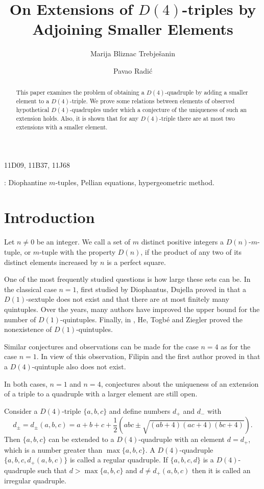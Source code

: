 \documentclass[12pt]{amsart}%
\title{On Extensions of $D(4)$-triples by Adjoining Smaller Elements}
\author{Marija {Bliznac Trebje\v{s}anin}}
\author{Pavao Radi\'{c}}
\theoremstyle{definition}
\theoremstyle{remark}
\theoremstyle{plain}
\begin{document}
\begin{abstract} 
This paper examines the problem of obtaining a $D(4)$-quadruple by adding a smaller element to a $D(4)$-triple. We prove some relations between elements of observed hypothetical $D(4)$-quadruples under which a conjecture of the uniqueness of such an extension holds. Also, it is shown that for any $D(4)$-triple there are at most two extensions with a smaller element.
\end{abstract}

\maketitle

 11D09, 11B37, 11J68

: Diophantine $m$-tuples, Pellian equations, hypergeometric method.


\section{Introduction}


Let $n\neq0$ be an integer. We call a set of $m$ distinct positive integers a $D(n)$-$m$-tuple, or $m$-tuple with the property $D(n)$, if the product of any two of its distinct elements increased by $n$ is a perfect square.

One of the most frequently studied questions is how large these sets can be. In the classical case $n=1$, first studied by Diophantus, Dujella proved in \cite{duje_kon} that a $D(1)$-sextuple does not exist and that there are at most finitely many quintuples. Over the years, many authors have improved the upper bound for the number of $D(1)$-quintuples. Finally, in \cite{petorke}, He, Togb\'{e} and Ziegler proved the nonexistence of $D(1)$-quintuples. 

Similar conjectures and observations can be made for the case $n=4$ as for the case $n=1$.
In view of this observation, Filipin and the first author proved in \cite{nas2} that a $D(4)$-quintuple also does not exist.

In both cases, $n=1$ and $n=4$, conjectures about the uniqueness of an extension of a triple to a quadruple with a larger element are still open. 

 Consider a $D(4)$-triple $\{a,b,c\}$ and define numbers $d_+$ and $d_-$ with
 $$d_{\pm}=d_{\pm}(a,b,c)=a+b+c+\frac{1}{2}(abc\pm \sqrt{(ab+4)(ac+4)(bc+4)}).$$
 Then $\{a,b,c\}$ can be extended to a $D(4)$-quadruple with an element $d=d_+$, which is a number greater than $\max\{a,b,c\}$.
A $D(4)$-quadruple $\{a,b,c,d_+(a,b,c)\}$ is called a regular quadruple. If $\{a,b,c,d\}$ is a $D(4)$-quadruple such that $d>\max\{a,b,c\}$ and $d\neq d_+(a,b,c)$ then it is called an irregular quadruple.
\end{document}
